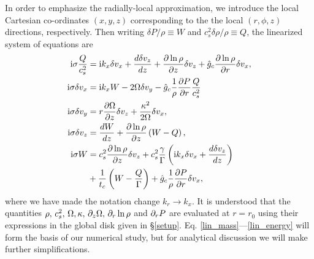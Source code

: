In order to emphasize the radially-local approximation, we
introduce the local Cartesian co-ordinates $(x,y,z)$ corresponding to
the the local $(r,\phi,z)$ directions, respectively. Then writing
$\delta P /\rho \equiv W$ and $c_s^2\delta\rho/\rho\equiv Q$, the
linearized system of equations are 
\begin{align}
  \mathrm{i}\sigma \frac{Q}{c_s^2}  &=  \mathrm{i} k_x \delta v_x + \frac{d\delta
    v_z}{dz} + \frac{\partial\ln{\rho}}{\partial z}\delta v_z + \hat{g}_c
  \frac{\partial\ln{\rho}}{\partial r} \delta v_x,\label{lin_mass}\\
  \mathrm{i}\sigma \delta v_x  &= \mathrm{i} k_x W - 2\Omega\delta v_y -
  \hat{g}_c\frac{1}{\rho}\frac{\partial P}{\partial r}\frac{Q}{c_s^2}\label{lin_vx}\\
   \mathrm{i} \sigma\delta v_y &= r\frac{\partial \Omega}{\partial z}\delta v_z +
  \frac{\kappa^2}{2\Omega}\delta v_x, \label{lin_vy}\\
   \mathrm{i}\sigma\delta v_z &= \frac{dW}{dz} +
  \frac{\partial\ln{\rho}}{\partial z}\left(W-Q\right), \label{lin_vz}\\
  \mathrm{i} \sigma W &= c_s^2\frac{\partial\ln{\rho}}{\partial z}\delta v_z +
  c_s^2\frac{\gamma}{\Gamma} \left(\mathrm{i} k_x\delta v_x + \frac{d\delta
      v_z}{dz}\right) \notag\\
  &+ \frac{1}{t_c}\left(W - \frac{Q}{\Gamma}\right) +
  \hat{g}_c\frac{1}{\rho}\frac{\partial P}{\partial r}\delta v_x,\label{lin_energy}
\end{align}
where we have made the notation change $k_r\to k_x$. 
It is understood that the quantities $\rho,\,c_s^2,\,\Omega,\kappa,\, 
\partial_z\Omega,\, \partial_r\ln{\rho} $ and $ \partial_r P$ are evaluated at $r=r_0$
using their expressions in the global disk given in \S\ref{setup}. 
Eq. \ref{lin_mass}---\ref{lin_energy} will form the basis of our numerical
study, but for analytical discussion
we will make further simplifications. 


